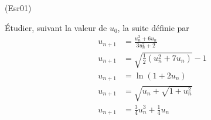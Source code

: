 \begin{tiny}(Esr01)\end{tiny}
\'Etudier, suivant la valeur de $u_{0}$, la suite d{\'e}finie par
\begin{align*}
u_{n+1}&=\frac{u_{n}^{3}+6u_{n}}{3u_{n}^{2}+2} \\
u_{n+1}&=\sqrt{\frac{1}{2}(u_{n}^{2}+7u_{n})}-1 \\
u_{n+1}&=\ln (1+2u_{n})\\
u_{n+1}&=\sqrt{u_n+\sqrt{1+u_n^2}}\\
u_{n+1}&= \frac{3}{4}u_n^3 + \frac{1}{4}u_n
\end{align*}